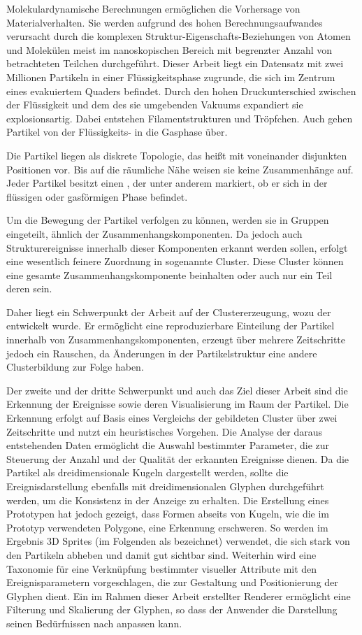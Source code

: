 Molekulardynamische Berechnungen ermöglichen die Vorhersage von Materialverhalten. Sie werden aufgrund des hohen Berechnungsaufwandes verursacht durch die komplexen Struktur-Eigenschafts-Beziehungen von Atomen und Molekülen meist im nanoskopischen Bereich mit begrenzter Anzahl von betrachteten Teilchen durchgeführt. Dieser Arbeit liegt ein Datensatz mit zwei Millionen Partikeln in einer Flüssigkeitsphase zugrunde, die sich im Zentrum eines evakuiertem Quaders befindet. Durch den hohen Druckunterschied zwischen der Flüssigkeit und dem des sie umgebenden Vakuums expandiert sie explosionsartig. Dabei entstehen Filamentstrukturen und Tröpfchen. Auch gehen Partikel von der Flüssigkeits- in die Gasphase über.

Die Partikel liegen als diskrete Topologie, das heißt mit voneinander disjunkten Positionen vor. Bis auf die räumliche Nähe weisen sie keine Zusammenhänge auf. Jeder Partikel besitzt einen , der unter anderem markiert, ob er sich in der flüssigen oder gasförmigen Phase befindet.

Um die Bewegung der Partikel verfolgen zu können, werden sie in Gruppen eingeteilt, ähnlich der Zusammenhangskomponenten. Da jedoch auch Strukturereignisse innerhalb dieser Komponenten erkannt werden sollen, erfolgt eine wesentlich feinere Zuordnung in sogenannte Cluster. Diese Cluster können eine gesamte Zusammenhangskomponente beinhalten oder auch nur ein Teil deren sein.

Daher liegt ein Schwerpunkt der Arbeit auf der Clustererzeugung, wozu der  entwickelt wurde. Er ermöglicht eine reproduzierbare Einteilung der Partikel innerhalb von Zusammenhangskomponenten, erzeugt über mehrere Zeitschritte jedoch ein Rauschen, da Änderungen in der Partikelstruktur eine andere Clusterbildung zur Folge haben.

Der zweite und der dritte Schwerpunkt und auch das Ziel dieser Arbeit sind die Erkennung der Ereignisse sowie deren Visualisierung im Raum der Partikel. Die Erkennung erfolgt auf Basis eines Vergleichs der gebildeten Cluster über zwei Zeitschritte und nutzt ein heuristisches Vorgehen. Die Analyse der daraus entstehenden Daten ermöglicht die Auswahl bestimmter Parameter, die zur Steuerung der Anzahl und der Qualität der erkannten Ereignisse dienen.
Da die Partikel als dreidimensionale Kugeln dargestellt werden,
sollte die Ereignisdarstellung ebenfalls mit dreidimensionalen Glyphen durchgeführt werden, um die Konsistenz in der Anzeige zu erhalten. Die Erstellung eines Prototypen hat jedoch gezeigt, dass Formen abseits von Kugeln, wie die im Prototyp verwendeten Polygone, eine Erkennung erschweren. So werden im Ergebnis 3D Sprites (im Folgenden als  bezeichnet) verwendet, die sich stark von den Partikeln abheben und damit gut sichtbar sind. Weiterhin wird eine Taxonomie für eine Verknüpfung bestimmter visueller Attribute mit den Ereignisparametern vorgeschlagen, die zur Gestaltung und Positionierung der Glyphen dient. Ein im Rahmen dieser Arbeit erstellter Renderer ermöglicht eine Filterung und Skalierung der Glyphen, so dass der Anwender die Darstellung seinen Bedürfnissen nach anpassen kann.

